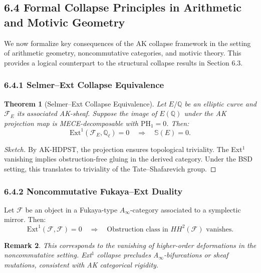 \documentclass[11pt]{article}
\newcommand{\Sha}{\mathbb{S}}
\newtheorem{theorem}{Theorem}[section]
\newtheorem{remark}[theorem]{Remark}
\begin{document}
\subsection{6.4 Formal Collapse Principles in Arithmetic and Motivic Geometry}

We now formalize key consequences of the AK collapse framework in the setting of arithmetic geometry, noncommutative categories, and motivic theory. This provides a logical counterpart to the structural collapse results in Section 6.3.

\subsubsection*{6.4.1 Selmer–Ext Collapse Equivalence}

\begin{theorem}[Selmer–Ext Collapse Equivalence]
Let \( E/\mathbb{Q} \) be an elliptic curve and \( \mathcal{F}_E \) its associated AK-sheaf. Suppose the image of \( E(\mathbb{Q}) \) under the AK projection map is MECE-decomposable with \( \mathrm{PH}_1 = 0 \). Then:
\[
\mathrm{Ext}^1(\mathcal{F}_E, \mathbb{Q}_\ell) = 0 \quad \Rightarrow \quad \Sha(E) = 0.
\]
\end{theorem}

\begin{proof}[Sketch]
By AK-HDPST, the projection ensures topological triviality. The Ext$^1$ vanishing implies obstruction-free gluing in the derived category. Under the BSD setting, this translates to triviality of the Tate–Shafarevich group.
\end{proof}

\subsubsection*{6.4.2 Noncommutative Fukaya–Ext Duality}

\begin{proposition}
Let \( \mathcal{F} \) be an object in a Fukaya-type $A_\infty$-category associated to a symplectic mirror. Then:
\[
\mathrm{Ext}^1(\mathcal{F}, \mathcal{F}) = 0 \quad \Rightarrow \quad \text{Obstruction class in } HH^2(\mathcal{F}) \text{ vanishes.}
\]
\end{proposition}

\begin{remark}
This corresponds to the vanishing of higher-order deformations in the noncommutative setting. Ext$^1$ collapse precludes A$_\infty$-bifurcations or sheaf mutations, consistent with AK categorical rigidity.
\end{remark}
\end{document}
